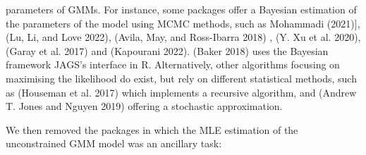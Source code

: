 \begin{itemize}
  parameters of GMMs. For instance, some packages offer a Bayesian
  estimation of the parameters of the model using MCMC methods, such
  as  Mohammadi (2021){]},  (Lu, Li, and Love 2022),  (Avila, May, and Ross-Ibarra 2018)
  ,  (Y. Xu et al. 2020),  (Garay et al. 2017) and
   (Kapourani 2022).  (Baker 2018) uses the Bayesian
  framework JAGS's interface in R. Alternatively, other algorithms
  focusing on maximising the likelihood do exist, but rely on
  different statistical methods, such as  (Houseman et al. 2017)
  which implements a recursive algorithm, and 
  (Andrew T. Jones and Nguyen 2019) offering a stochastic approximation.
\end{itemize}

We then removed the packages in which the MLE estimation of the
unconstrained GMM model was an ancillary task:

